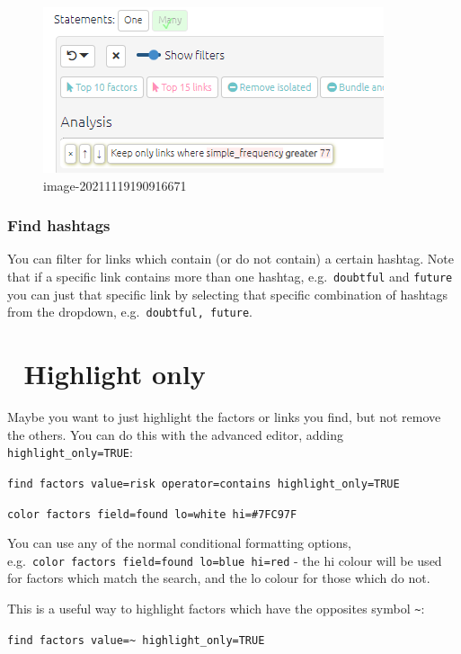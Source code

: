 \documentclass[
]{book}
\begin{document}
\begin{figure}
\centering
\includegraphics{_assets/image-20211119190916671.png}
\caption{image-20211119190916671}
\end{figure}

\hypertarget{find-hashtags}{%
\subsubsection{Find hashtags}\label{find-hashtags}}

You can filter for links which contain (or do not contain) a certain hashtag. Note that if a specific link contains more than one hashtag, e.g.~\texttt{doubtful} and \texttt{future} you can just that specific link by selecting that specific combination of hashtags from the dropdown, e.g.~\texttt{doubtful,\ future}.

\hypertarget{highlight-only}{%
\section{🧪 Highlight only}\label{highlight-only}}

Maybe you want to just highlight the factors or links you find, but not remove the others. You can do this with the advanced editor, adding \texttt{highlight\_only=TRUE}:

\texttt{find\ factors\ value=risk\ operator=contains\ highlight\_only=TRUE}

\texttt{color\ factors\ field=found\ lo=white\ hi=\#7FC97F}

You can use any of the normal conditional formatting options, e.g.~\texttt{color\ factors\ field=found\ lo=blue\ hi=red} - the hi colour will be used for factors which match the search, and the lo colour for those which do not.

This is a useful way to highlight factors which have the opposites symbol \texttt{\textasciitilde{}}:

\texttt{find\ factors\ value=\textasciitilde{}\ highlight\_only=TRUE}
\end{document}
